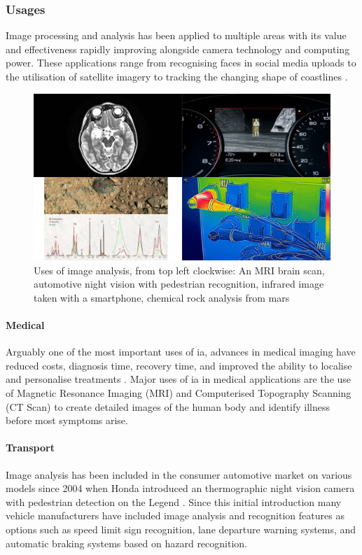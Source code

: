 	\subsubsection{Usages}
	Image processing and analysis has been applied to multiple areas with its value and 
	effectiveness rapidly improving alongside camera technology and computing power. These 
	applications range from recognising faces in social media uploads \citep{zuckerberg2011tagging} 
	to the utilisation of satellite imagery to tracking the changing shape of coastlines 
	\citep{costalimagery}.
	\begin{figure}[h!]
		\centering
		\includegraphics[width=15cm]{../images/4panel.png}
		\caption[Uses of image analysis]{Uses of image analysis, from top left clockwise: An MRI brain scan, automotive 
		night vision with pedestrian recognition, infrared image taken with a smartphone, chemical 
		rock analysis from 
			mars}
		\label{fig:curiosity}
	\end{figure}
	\paragraph{Medical}
	Arguably one of the most important uses of \gls{ia}, advances in medical imaging have reduced costs, diagnosis time, recovery time, and improved the ability to localise and personalise treatments \citep{esfmedical}. Major uses of \gls{ia} in medical applications are the use of Magnetic Resonance Imaging (MRI) and Computerised Topography Scanning (CT Scan) to create detailed images of the human body and identify illness before most symptoms arise.
	\paragraph{Transport}
	Image analysis has been included in the consumer automotive market on various models since 2004 when Honda introduced an thermographic night vision camera with pedestrian detection on the Legend  \citep{hondanightvision}. Since this initial introduction many vehicle manufacturers have included image analysis and recognition features as options such as speed limit sign recognition, lane departure warning systems, and automatic braking systems based on hazard recognition.
